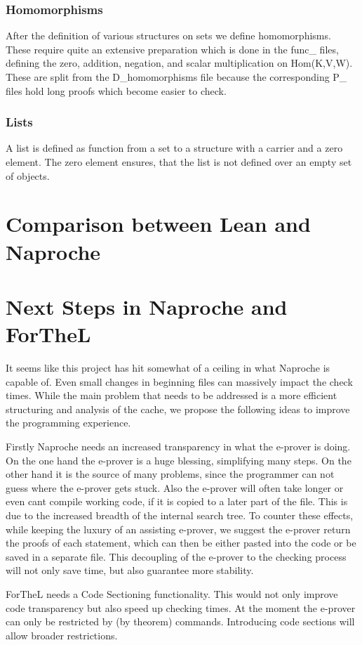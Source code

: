 \documentclass[11pt]{article}
\begin{document}
\subsubsection{Homomorphisms}

After the definition of various structures on sets we define homomorphisms. These require quite an extensive preparation which is done in the func\_ files, defining the zero, addition, negation, and scalar multiplication on Hom(K,V,W). These are split from the D\_homomorphisms file because the corresponding P\_ files hold long proofs which become easier to check.

\subsubsection{Lists}

A list is defined as function from a set to a structure with a carrier and a zero element. The zero element ensures, that the list is not defined over an empty set of objects. 

\section{Comparison between Lean and Naproche}


\section{Next Steps in Naproche and ForTheL}

It seems like this project has hit somewhat of a ceiling in what Naproche is capable of. 
Even small changes in beginning files can massively impact the check times.
While the main problem that needs to be addressed is a more efficient structuring and analysis of the cache, we propose the following ideas to improve the programming experience.

Firstly Naproche needs an increased transparency in what the e-prover is doing. On the one hand the e-prover is a huge blessing, simplifying many steps. On the other hand it is the source of many problems, since the programmer can not guess where the e-prover gets stuck. Also the e-prover will often take longer or even cant compile working code, if it is copied to a later part of the file. This is due to the increased breadth of the internal search tree. To counter these effects, while keeping the luxury of an assisting e-prover, we suggest the e-prover return the proofs of each statement, which can then be either pasted into the code or be saved in a separate file. This decoupling of the e-prover to the checking process will not only save time, but also guarantee more stability.

ForTheL needs a Code Sectioning functionality. This would not only improve code transparency but also speed up checking times. At the moment the e-prover can only be restricted by (by theorem) commands. Introducing code sections will allow broader restrictions.
\end{document}
